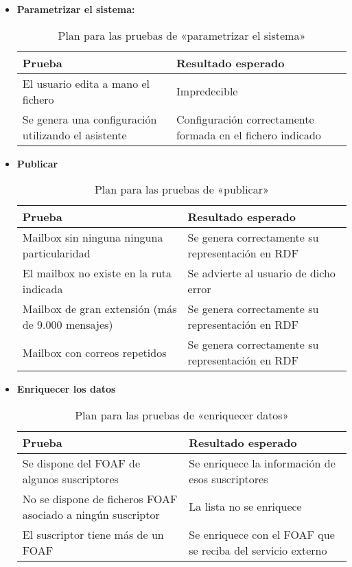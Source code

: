 \begin{itemize}

  \item \textbf{Parametrizar el sistema:}
	\begin{table}[H]
	 \begin{center}
	  \begin{tabular}{|p{5cm}|p{7cm}|}
		\hline
		\textbf{Prueba} & \textbf{Resultado esperado} \\ 
		\hline
		El usuario edita a mano el fichero 
		& 
		Impredecible
		\\\hline
		Se genera una configuración utilizando el asistente
		& 
		Configuración correctamente formada en el fichero indicado
		\\\hline
	  \end{tabular}
	  \caption{Plan para las pruebas de «parametrizar el sistema»}
	 \end{center}
	\end{table}

  \item \textbf{Publicar}
	\begin{table}[H]
	 \begin{center}
	  \begin{tabular}{|p{5cm}|p{7cm}|}
		\hline
		\textbf{Prueba} & \textbf{Resultado esperado} \\ 
		\hline
		Mailbox sin ninguna ninguna particularidad 
		& 
		Se genera correctamente su representación en RDF
		\\\hline
		El mailbox no existe en la ruta indicada 
		& 
		Se advierte al usuario de dicho error
		\\\hline
		Mailbox de gran extensión (más de 9.000 mensajes)
		& 
		Se genera correctamente su representación en RDF
		\\\hline
		Mailbox con correos repetidos
		& 
		Se genera correctamente su representación en RDF
		\\\hline
	  \end{tabular}
	  \caption{Plan para las pruebas de «publicar»}
	 \end{center}
	\end{table}

  \item \textbf{Enriquecer los datos}
	\begin{table}[H]
	 \begin{center}
	  \begin{tabular}{|p{5cm}|p{7cm}|}
		\hline
		\textbf{Prueba} & \textbf{Resultado esperado} \\ 
		\hline
		Se dispone del FOAF de algunos suscriptores
		& 
		Se enriquece la información de esos suscriptores
		\\\hline
		No se dispone de ficheros FOAF asociado a ningún suscriptor
		& 
		La lista no se enriquece
		\\\hline
		El suscriptor tiene más de un FOAF
		& 
		Se enriquece con el FOAF que se reciba del servicio externo
		\\\hline
	  \end{tabular}
	  \caption{Plan para las pruebas de «enriquecer datos»}
	 \end{center}
	\end{table}


\end{itemize}
